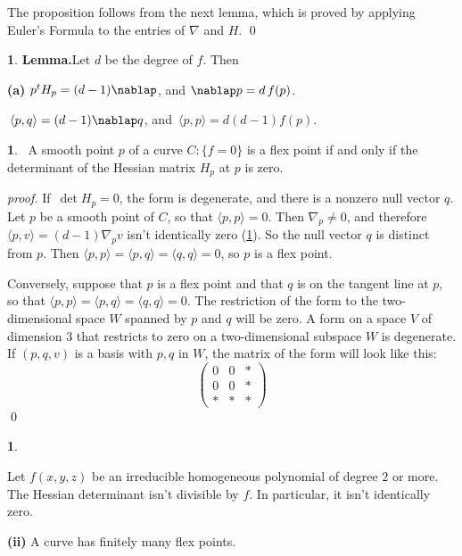 \documentclass[leqno]{book}
\newcommand\Marginnote[1]{\marginnote{\hspace{-12pt}\normalfont{#1}}}
\theoremstyle{definition}%
\numberwithin{equation}{section}
\theoremstyle{theorem} %
\newtheorem{lemma}[equation]{}
\newtheorem{proposition}[equation]{}
\newtheorem{theorem}[equation]{}
\renewenvironment{proof}{\no \emph{proof.}}{}
\begin{document}
The proposition follows from the next lemma, which
is proved by applying
Euler's Formula to the entries of $\nabla$ and $H$. \qed



\begin{lemma}{\bf Lemma.}\label{applyeuler}
Let $d$ be the degree of $f$.  Then 

\no
{\bf (a)} $p^tH_p =
(d-1)\nablap$, and  $\nablap p = d\,f(p)$.

  $\,\langle
p,q\rangle = (d-1)\nablap q$, and $\,\langle p,p\rangle =
d(d-1)f(p)$.
\end{lemma}



\begin{theorem}{}\Marginnote{tangentline}\;\,
A smooth point $p$ of a curve $C:\{f=0\}$ is a flex point if and only
if the determinant of the Hessian matrix $H_p$ at $p$ is zero.
 \label{tangentline}\end{theorem}

\begin{proof}
If $\,\det H_p =0$, the form is degenerate, and there is a nonzero
null vector $q$.  Let $p$ be a smooth point of $C$, so that $\langle
p,p\rangle=0$.  Then $\nabla_p \neq 0$, and therefore $\langle
p,v\rangle = (d-1)\nabla_p v$ isn't identically zero
(\ref{applyeuler}).  So the null vector $q$ is distinct from $p$.
Then $\langle p,p\rangle=\langle p,q\rangle = \langle q,q\rangle = 0$,
so $p$ is a flex point.

Conversely, suppose that $p$ is a flex point and that $q$ is on the
tangent line at $p$, so that $\langle p,p\rangle = \langle p,q\rangle
= \langle q,q\rangle = 0$.  The restriction of the form to the
two-dimensional space $W$ spanned by $p$ and $q$ will be zero. A form
on a space $V$ of dimension $3$ that restricts to zero on a
two-dimensional subspace $W$ is degenerate.  If $(p,q,v)$ is a basis
with $p,q$ in $W$, the matrix of the form will 
look like this:
$$\begin{pmatrix} 0 & 0 & *\\
0 & 0 & *\\
* & * & *
\end{pmatrix}
$$ 
\hspace{-0.7cm}\qed\end{proof}


\begin{proposition}{}\Marginnote{hessnotzero}\;\,

 Let $f(x,y,z)$ be an irreducible homogeneous polynomial
of degree $2$ or more.  The Hessian determinant isn't divisible by
$f$. In particular, it isn't identically zero.

\no
{\bf (ii)} A curve has finitely many flex points.
\label{hessnotzero}\end{proposition}
\end{document}
